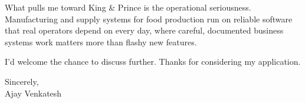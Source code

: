 \documentclass[letterpaper,11pt]{article}
\begin{document}
What pulls me toward King \& Prince is the operational seriousness. Manufacturing and supply systems for food production run on reliable software that real operators depend on every day, where careful, documented business systems work matters more than flashy new features.

I'd welcome the chance to discuss further. Thanks for considering my application.

\vspace{12pt}
Sincerely, \\
Ajay Venkatesh
\end{document}
